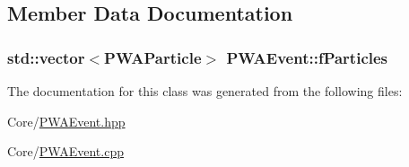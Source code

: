\subsection{Member Data Documentation}
\hypertarget{classPWAEvent_aac928bac7991d55225c0219c4c9ddf7a}{
\subsubsection[{fParticles}]{\setlength{\rightskip}{0pt plus 5cm}std::vector$<${\bf PWAParticle}$>$ {\bf PWAEvent::fParticles}}}
\label{dc/d66/classPWAEvent_aac928bac7991d55225c0219c4c9ddf7a}


The documentation for this class was generated from the following files:\begin{DoxyCompactItemize}
\item 
Core/\hyperlink{PWAEvent_8hpp}{PWAEvent.hpp}\item 
Core/\hyperlink{PWAEvent_8cpp}{PWAEvent.cpp}\end{DoxyCompactItemize}
